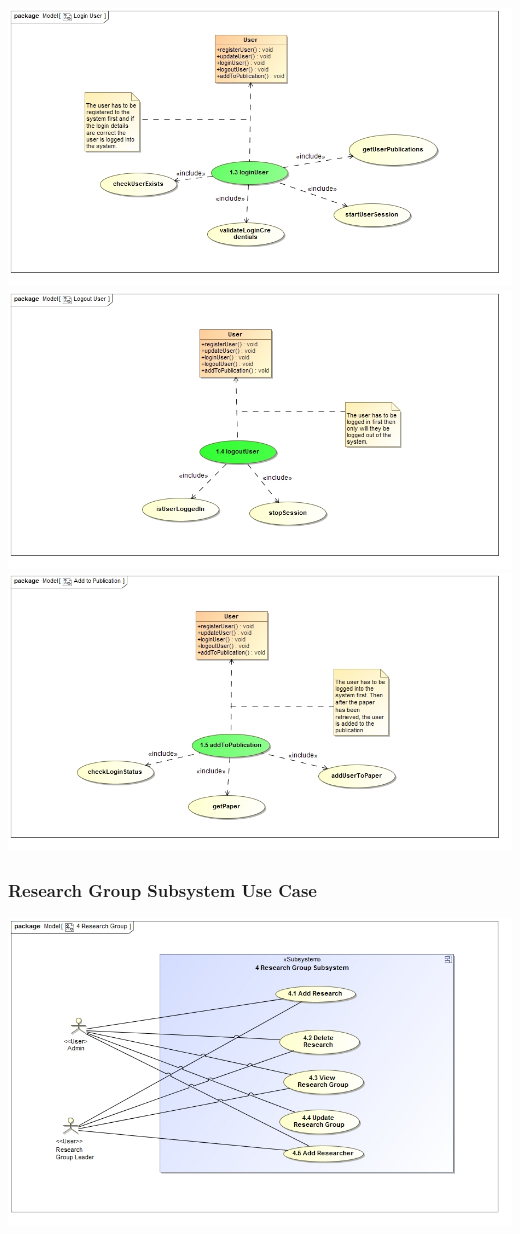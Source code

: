 \documentclass{article}
\begin{document}
				\includegraphics[width=\textwidth]{LoginUser}
				\includegraphics[width=\textwidth]{LogoutUser}
				\includegraphics[width=\textwidth]{AddtoPublication}
			
			\subsubsection{Research Group Subsystem Use Case}
				\includegraphics[width=\textwidth]{ResearchGroup}
\end{document}

